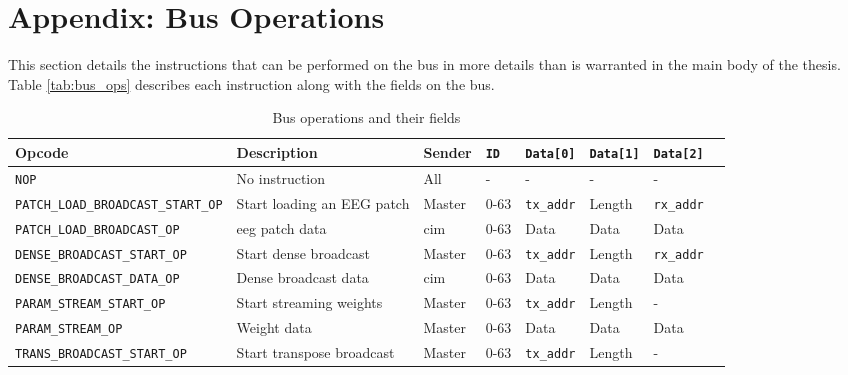 \appendix
\section{Appendix: Bus Operations}
\label{app:bus_ops}
This section details the instructions that can be performed on the bus in more details than is warranted in the main body of the thesis. Table \ref{tab:bus_ops} describes
each instruction along with the fields on the bus.

\begin{sidewaystable}
    \centering
    \renewcommand{\arraystretch}{1.2} %
    \setlength{\arrayrulewidth}{1.5pt} %
    \caption{Bus operations and their fields}
    \scriptsize
    \begin{tabular}{@{} p{6.5cm}lllllll @{}}
        \toprule
        Opcode                                      & Description                       & Sender        & \texttt{ID}   & \texttt{Data[0]}  & \texttt{Data[1]}  & \texttt{Data[2]} \\\midrule
        \texttt{NOP}                                & No instruction                    & All           & -             & -                 & -                 & - \\
        \texttt{PATCH\_LOAD\_BROADCAST\_START\_OP}  & Start loading an EEG patch        & Master        & 0-63          & \texttt{tx\_addr} & Length            & \texttt{rx\_addr} \\
        \texttt{PATCH\_LOAD\_BROADCAST\_OP}         & \ac{eeg} patch data               & \ac{cim}      & 0-63          & Data              & Data              & Data \\
        \texttt{DENSE\_BROADCAST\_START\_OP}        & Start dense broadcast             & Master        & 0-63          & \texttt{tx\_addr} & Length            & \texttt{rx\_addr} \\
        \texttt{DENSE\_BROADCAST\_DATA\_OP}         & Dense broadcast data              & \ac{cim}      & 0-63          & Data              & Data              & Data \\
        \texttt{PARAM\_STREAM\_START\_OP}           & Start streaming weights           & Master        & 0-63          & \texttt{tx\_addr} & Length            & - \\
        \texttt{PARAM\_STREAM\_OP}                  & Weight data                       & Master        & 0-63          & Data              & Data              & Data \\
        \texttt{TRANS\_BROADCAST\_START\_OP}        & Start transpose broadcast         & Master        & 0-63          & \texttt{tx\_addr} & Length            & - \\

\end{tabular}
\end{sidewaystable}
